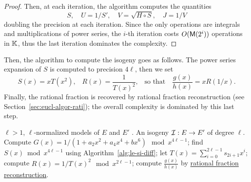 \begin{proof}
  Then, at each iteration, the algorithm computes the quantities
  \begin{equation}
    \label{eq:174}
    S,\quad U = 1/S',\quad V = \sqrt{H\circ S},\quad J = 1/V
  \end{equation}
  doubling the precision at each iteration. Since the only operations
  are integrals and multiplications of power series, the $i$-th
  iteration costs $O(\mathsf{M}(2^i))$ operations in $\mathbb{K}$, thus the last
  iteration dominates the complexity.
\end{proof}


Then, the algorithm to compute the isogeny goes as follows.  The power
series expansion of $S$ is computed to precision $4\ell$, then we set
\begin{equation}
  \label{eq:180}
  S(x) = xT(x^2)
  \text{,}\quad
  R(x) = \frac{1}{T(x)^2}
  \text{,}\quad\text{so that}\quad
  \frac{g(x)}{h(x)} = xR(1/x)
  \text{.}
\end{equation}
Finally, the rational fraction is recovered by rational fraction
reconstruction (see Section~\ref{sec:eucl-algor-rati}); the overall
complexity is dominated by this last step.

\begin{algorithm}
  \caption{}
  \label{alg:bmss}
  \begin{algorithmic}[1]
    \REQUIRE $\ell>1$, $\ell$-normalized models of $E$ and $E'$ .
    \ENSURE An isogeny $\mathcal{I}:E\rightarrow E'$ of degree $\ell$.
    \STATE Compute $G(x) = 1/(1 + a_2x^2 + a_4x^4 + bx^6) \mod x^{4\ell-1}$;
    \STATE find $S(x)\bmod x^{4\ell-1}$ using Algorithm~\ref{alg:le-si-diff};
    \STATE let $T(x) = \sum_{i=0}^{2\ell-1}s_{2i+1}x^i$;
    \STATE compute $R(x) = 1/T(x)^2 \mod x^{2\ell-1}$;
    \STATE compute $\frac{g(x)}{h(x)}$ by \hyperref[sec:eucl-algor-rati]{rational fraction reconstruction}.
  \end{algorithmic}
\end{algorithm}

